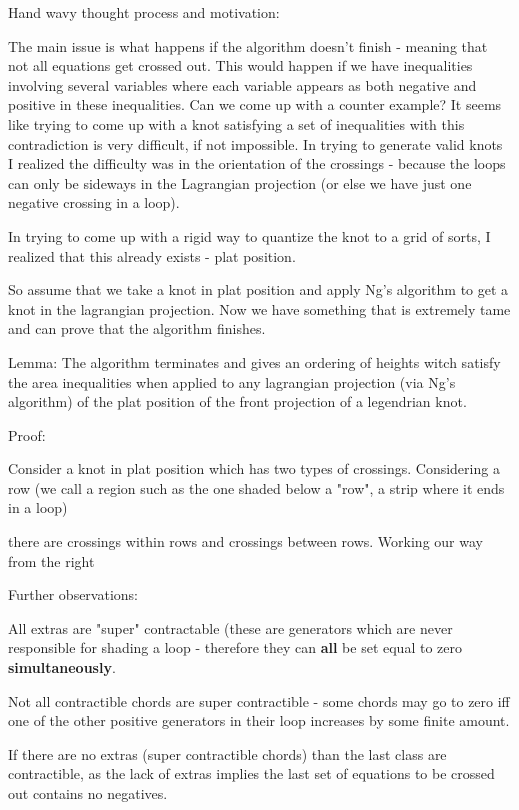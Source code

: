 \documentclass[11pt]{amsart}
\begin{document}
Hand wavy thought process and motivation: 

The main issue is what happens if the algorithm doesn't finish - meaning that not all equations get crossed out. This would happen if we have inequalities involving several variables where each variable appears as both negative and positive in these inequalities. Can we come up with a counter example? It seems like trying to come up with a knot satisfying a set of inequalities with this contradiction is very difficult, if not impossible. In trying to generate valid knots I realized the difficulty was in the orientation of the crossings - because the loops can only be sideways in the Lagrangian projection (or else we have just one negative crossing in a loop). 

In trying to come up with a rigid way to quantize the knot to a grid of sorts, I realized that this already exists - plat position.

So assume that we take a knot in plat position and apply Ng's algorithm to get a knot in the lagrangian projection. Now we have something that is extremely tame and can prove that the algorithm finishes.



Lemma: The algorithm terminates and gives an ordering of heights witch satisfy the area inequalities when applied to any lagrangian projection (via Ng's algorithm) of the plat position of the front projection of a legendrian knot. 

Proof:

Consider a knot in plat position which has two types of crossings. Considering a row (we call a region such as the one shaded below a "row", a strip where it ends in a loop)



there are crossings within rows and crossings between rows. Working our way from the right






Further observations:

All extras are "super" contractable (these are generators which are never responsible for shading a loop - therefore they can \textbf{all} be set equal to zero \textbf{simultaneously}.

Not all contractible chords are super contractible - some chords may go to zero iff one of the other positive generators in their loop increases by some finite amount. 


If there are no extras (super contractible chords) than the last class are contractible, as the lack of extras implies the last set of equations to be crossed out contains no negatives. 
\end{document}
